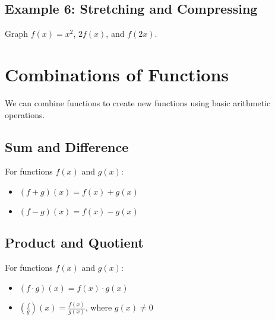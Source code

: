 \documentclass[12pt]{article}
\begin{document}
\subsection{Example 6: Stretching and Compressing}

Graph $f(x) = x^2$, $2f(x)$, and $f(2x)$.

\begin{center}
\end{center}

\section{Combinations of Functions}

We can combine functions to create new functions using basic arithmetic operations.

\subsection{Sum and Difference}

For functions $f(x)$ and $g(x)$:
\begin{itemize}
    \item $(f + g)(x) = f(x) + g(x)$
    \item $(f - g)(x) = f(x) - g(x)$
\end{itemize}

\subsection{Product and Quotient}

For functions $f(x)$ and $g(x)$:
\begin{itemize}
    \item $(f \cdot g)(x) = f(x) \cdot g(x)$
    \item $(\frac{f}{g})(x) = \frac{f(x)}{g(x)}$, where $g(x) \neq 0$
\end{itemize}
\end{document}
